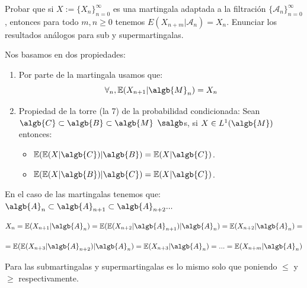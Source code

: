 \begin{problem}[5] Probar que si $X := \{X_n\}_{n=0}^{\infty}$  es una martingala adaptada a la filtraci\'on
$\{\mathcal{A}_n\}_{n=0}^{\infty}$, entonces para todo $m, n\ge 0$ tenemos
$E(X_{n + m}|\mathcal{A}_n) = X_n$. Enunciar los resultados an\'alogos para sub y supermartingalas.
\solution

\begin{expla}
Nos basamos en dos propiedades:
\begin{enumerate}
\item Por parte de la martingala usamos que:
$$\forall_n, \mathbb{E}(X_{n+1}|\algb{M}_n)=X_n$$
\item Propiedad de la torre (la 7) de la probabilidad condicionada:
Sean $\algb{C} \subset \algb{B} \subset \algb{M}$ $\salgb$s, si $X \in L^ 1(\algb{M})$ entonces:
\begin{itemize}
\item $\mathbb{E}(\mathbb{E}(X|\algb{C})|\algb{B}) = \mathbb{E}(X|\algb{C})$.
\item $\mathbb{E}(\mathbb{E}(X|\algb{B})|\algb{C}) = \mathbb{E}(X|\algb{C})$.
\end{itemize}
\end{enumerate}
\end{expla}
En el caso de las martingalas tenemos que:
$\algb{A}_n \subset \algb{A}_{n+1} \subset \algb{A}_{n+2}...$

\[
X_n = \mathbb{E}(X_{n+1}|\algb{A}_n) = \mathbb{E}(\mathbb{E}(X_{n+2}|\algb{A}_{n+1})|\algb{A}_n) = \mathbb{E}(X_{n+2}|\algb{A}_n) =
\]

\[
= \mathbb{E}(\mathbb{E}(X_{n+3}|\algb{A}_{n+2})|\algb{A}_n) =
\mathbb{E}(X_{n+3}|\algb{A}_n) = ... = \mathbb{E}(X_{n+m}|\algb{A}_n)
\]

Para las submartingalas y supermartingalas es lo mismo solo que poniendo $\leq$ y $\geq$ respectivamente.
\end{problem}


